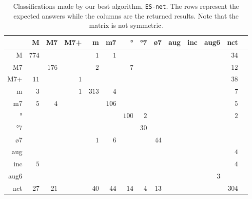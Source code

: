 \begin{table*}
\centering
\begin{tabular}{r||r|r|r|r|r|r|r|r|r|r|r|r|r}
      &     M &    M7 &   M7+ &     m &    m7 &    ° &   °7 &   ø7 &   aug &   inc &  aug6 &   nct \\  \hline \hline
    M & $ 774 $ & $     $ & $     $ & $   1 $ & $   1 $ & $     $ & $     $ & $     $ & $     $ & $     $ & $     $ & $  34 $ \\ \hline
   M7 & $     $ & $ 176 $ & $     $ & $   2 $ & $     $ & $   7 $ & $     $ & $     $ & $     $ & $     $ & $     $ & $  12 $ \\ \hline
  M7+ & $  11 $ & $     $ & $   1 $ & $     $ & $     $ & $     $ & $     $ & $     $ & $     $ & $     $ & $     $ & $  38 $ \\ \hline
    m & $   3 $ & $     $ & $   1 $ & $ 313 $ & $   4 $ & $     $ & $     $ & $     $ & $     $ & $     $ & $     $ & $   7 $ \\ \hline
   m7 & $   5 $ & $   4 $ & $     $ & $     $ & $ 106 $ & $     $ & $     $ & $     $ & $     $ & $     $ & $     $ & $   5 $ \\ \hline
   ° & $     $ & $     $ & $     $ & $     $ & $     $ & $ 100 $ & $   2 $ & $     $ & $     $ & $     $ & $     $ & $   2 $ \\ \hline
  °7 & $     $ & $     $ & $     $ & $     $ & $     $ & $     $ & $  30 $ & $     $ & $     $ & $     $ & $     $ & $     $ \\ \hline
  ø7 & $     $ & $     $ & $     $ & $   1 $ & $   6 $ & $     $ & $     $ & $  44 $ & $     $ & $     $ & $     $ & $     $ \\ \hline
  aug & $     $ & $     $ & $     $ & $     $ & $     $ & $     $ & $     $ & $     $ & $     $ & $     $ & $     $ & $   4 $ \\ \hline
  inc & $   5 $ & $     $ & $     $ & $     $ & $     $ & $     $ & $     $ & $     $ & $     $ & $     $ & $     $ & $   4 $ \\ \hline
 aug6 & $     $ & $     $ & $     $ & $     $ & $     $ & $     $ & $     $ & $     $ & $     $ & $     $ & $   3 $ & $     $ \\ \hline
  nct & $  27 $ & $  21 $ & $     $ & $  40 $ & $  44 $ & $  14 $ & $   4 $ & $  13 $ & $     $ & $     $ & $     $ & $ 304 $ \\ \hline
\end{tabular}
\caption{Classifications made by our best algorithm, \texttt{ES-net}. The rows represent
  the expected answers while the columns are the returned
  results. Note that the matrix is not symmetric.}
\label{tab:erros-ES-net}
\end{table*}

